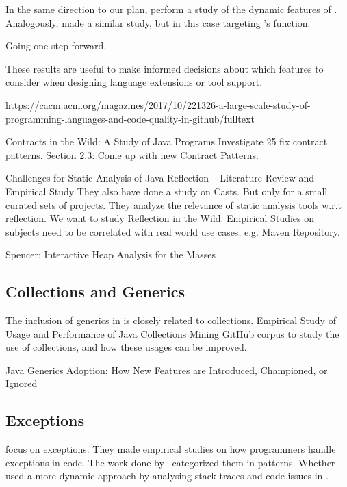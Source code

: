 In the same direction to our plan, \cite{Callau:2011:DUD:1985441.1985448} perform a study of the dynamic features of \smalltalk{}.
Analogously, \cite{Richards:2011:EML:2032497.2032503} made a similar study, but in this case targeting \javascript{}'s \eval{} function.

Going one step forward, \cite{Ray:2017:LSP:3144574.3126905} 

These results are useful to make informed decisions about which features to consider when designing language extensions or tool support.

https://cacm.acm.org/magazines/2017/10/221326-a-large-scale-study-of-programming-languages-and-code-quality-in-github/fulltext



Contracts in the Wild: A Study of Java Programs
Investigate 25 fix contract patterns.
Section 2.3: Come up with new Contract Patterns.
\cite{dietrich_et_al:LIPIcs:2017:7259}

\cite{Landman:2017:CSA:3097368.3097429}
Challenges for Static Analysis of Java Reflection -- Literature Review and Empirical Study
They also have done a study on Casts.
But only for a small curated sets of projects.
They analyze the relevance of static analysis tools w.r.t reflection.
We want to study Reflection in the Wild.
Empirical Studies on subjects need to be correlated with real world use cases, e.g. Maven Repository.



Spencer: Interactive Heap Analysis for the Masses
\cite{DBLP:journals/corr/BrandauerW17}


\subsection*{Collections and Generics}

The inclusion of generics in \java{} is closely related to collections.
Empirical Study of Usage and Performance of Java Collections
Mining GitHub corpus to study the use of collections, and how these usages can be improved.
\cite{Costa:2017:ESU:3030207.3030221}

Java Generics Adoption: How New Features are Introduced, Championed, or Ignored~\cite{Parnin:2011:JGA:1985441.1985446}


\subsection*{Exceptions}

\cite{Kery:2016:EPP:2901739.2903497,Asaduzzaman:2016:DUE:2901739.2903500} focus on exceptions.
They made empirical studies on how programmers handle exceptions in \java{} code.
The work done by~\cite{Nakshatri:2016:AEH:2901739.2903499} categorized them in patterns.
Whether~\cite{7180074} used a more dynamic approach by analysing stack traces and code issues in \github{}.

